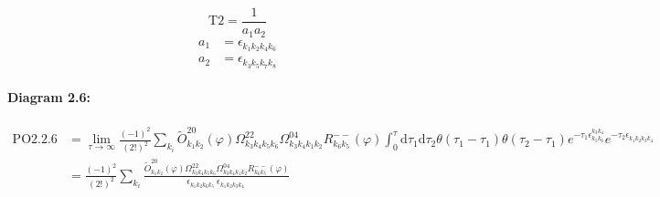 \documentclass[10pt,a4paper]{article}
\begin{document}
\begin{equation}
\text{T}2 = \frac{1}{a_1a_2}\end{equation}
\begin{align*}
a_1 &= \epsilon^{}_{k_{1}k_{2}k_{4}k_{6}}\\
a_2 &= \epsilon^{}_{k_{3}k_{5}k_{7}k_{8}}
\end{align*}
\paragraph{Diagram 2.6:}
\begin{align}
\text{PO}2.2.6
&= \lim\limits_{\tau \to \infty}\frac{(-1)^2 }{(2!)^2}\sum_{k_i}\tilde{O}^{20}_{k_{1}k_{2}} (\varphi) \Omega^{22}_{k_{3}k_{4}k_{5}k_{6}} \Omega^{04}_{k_{3}k_{4}k_{1}k_{2}} R^{--}_{k_{6}k_{5}}(\varphi)\int_{0}^{\tau}\mathrm{d}\tau_1\mathrm{d}\tau_2\theta(\tau_1-\tau_1) \theta(\tau_2-\tau_1) e^{-\tau_1 \epsilon^{k_{3}k_{4}}_{k_{5}k_{6}}}e^{-\tau_2 \epsilon^{}_{k_{1}k_{2}k_{3}k_{4}}}
 \nonumber \\
&= \frac{(-1)^2 }{(2!)^2}\sum_{k_i}\frac{\tilde{O}^{20}_{k_{1}k_{2}} (\varphi) \Omega^{22}_{k_{3}k_{4}k_{5}k_{6}} \Omega^{04}_{k_{3}k_{4}k_{1}k_{2}} R^{--}_{k_{6}k_{5}}(\varphi)}{\epsilon^{}_{k_{1}k_{2}k_{6}k_{5}}\ \epsilon^{}_{k_{1}k_{2}k_{3}k_{4}}\ } 
\end{align}
\end{document}
